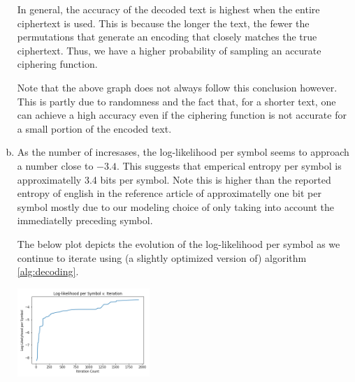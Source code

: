 \documentclass{siamart190516}
\begin{document}
\begin{enumerate}[(a)]
        In general, the accuracy of the decoded text is highest when the entire ciphertext is used. This is because the longer the text, the fewer the permutations that generate an encoding that closely matches the true ciphertext. Thus, we have a higher probability of sampling an accurate ciphering function.

        Note that the above graph does not always follow this conclusion however. This is partly due to randomness and the fact that, for a shorter text, one can achieve a high accuracy even if the ciphering function is not accurate for a small portion of the encoded text.

  \item As the number of incresases, the log-likelihood per symbol seems to approach a number close to $-3.4$. This suggests that emperical entropy per symbol is approximatelly 3.4 bits per symbol. Note this is higher than the reported entropy of english in the reference article of approximatelly one bit per symbol mostly due to our modeling choice of only taking into account the immediatelly preceding symbol.

        The below plot depicts the evolution of the log-likelihood per symbol as we continue to iterate using (a slightly optimized version of) algorithm \ref{alg:decoding}.

        \includegraphics[width=5cm]{loglikelihoodviterpersymb.png}

\end{enumerate}
\end{document}
